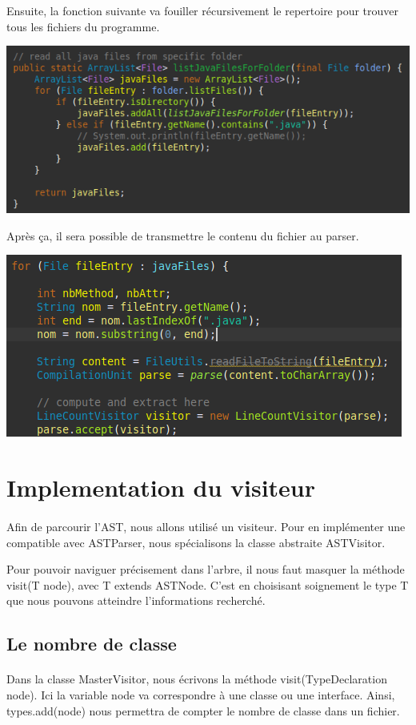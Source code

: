 \documentclass[a4paper]{article}
\begin{document}
\begin{multicols}{2}
        Ensuite, la fonction suivante va fouiller récursivement le repertoire pour trouver tous les fichiers du programme.
        
        \noindent\includegraphics[width=.47\textwidth]{parser/readAllFile.png}

        Après ça, il sera possible de transmettre le contenu du fichier au parser.

        \noindent\includegraphics[width=.47\textwidth]{parser/feeding}
        \section{Implementation du visiteur}
        \paragraph{} Afin de parcourir l'AST, nous allons utilisé un visiteur. Pour en implémenter une compatible avec ASTParser, nous spécialisons la classe abstraite ASTVisitor.

        Pour pouvoir naviguer précisement dans l'arbre, il nous faut masquer la méthode visit(T node), avec T extends ASTNode. C'est en choisisant soignement le type T que nous pouvons atteindre l'informations recherché.

        \subsection{Le nombre de classe}
        \paragraph{} Dans la classe MasterVisitor, nous écrivons la méthode visit(TypeDeclaration node). Ici la variable node va correspondre à une classe ou une interface. Ainsi, types.add(node) nous permettra de compter le nombre de classe dans un fichier. 
        

\end{multicols}
\end{document}
